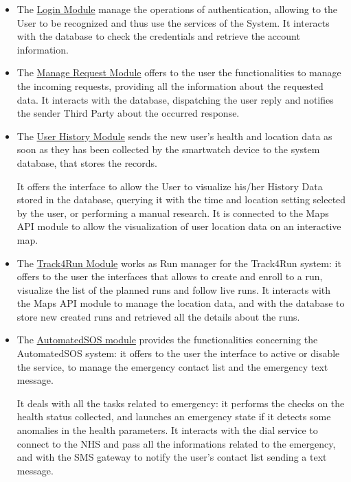 \begin{itemize}
    \item The \underline{Login Module}  manage the operations of authentication, allowing to the User to be recognized and thus use the services of the System. It interacts with the database to check the credentials and retrieve the account information.
    
    
    \item The \underline{Manage Request Module} offers to the user the functionalities to manage the incoming requests, providing all the information about the requested data. It interacts with the database, dispatching the user reply and notifies the sender Third Party about the occurred response.
    
    
    
    \item The \underline{User History Module} sends the new user's health and location data as soon as they has been collected by the smartwatch device  to the system database, that stores the records.
    
    It offers the interface to allow the User to visualize his/her History Data stored in the database, querying it with the time and location setting selected by the user, or performing a manual research. It is connected to the Maps API module to allow the visualization of user location data on an interactive map.
    
    
    \item The \underline{Track4Run Module} works as Run manager for the Track4Run system: it offers to the user the interfaces that allows to create and enroll to a run, visualize the list of the planned runs and follow live runs. It interacts with the Maps API module to manage the location data, and with the database to store new created runs and retrieved all the details about the runs. 
    
    \item The \underline{AutomatedSOS module} provides the functionalities concerning the AutomatedSOS system: it offers to the user the interface to active or disable the service, to manage the emergency contact list and the emergency text message.
    
    It deals with all the tasks related to emergency: it performs the checks on the health status collected, and launches  an emergency state if it detects some anomalies in the health parameters. It interacts with the dial service to connect to the NHS and pass all the informations related to the emergency, and with the SMS gateway to notify the user's contact list sending a text message.
    
    
    
\end{itemize}